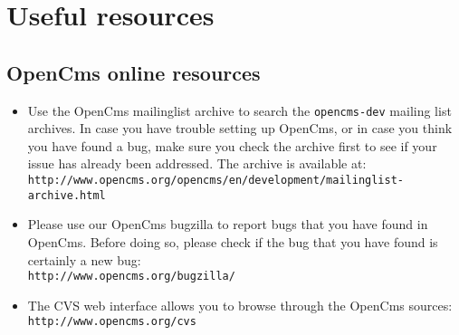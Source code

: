 \chapter{Useful resources}

\section{OpenCms online resources}

\begin{itemize}
\item Use the OpenCms mailinglist archive to search the {\tt opencms-dev} mailing list archives.
In case you have trouble setting up OpenCms, or in case you think you have found a bug,
make sure you check the archive first to see if your issue has already been addressed.
The archive is available at:\\
{\tt http://www.opencms.org/opencms/en/development/mailinglist-archive.html}
\item Please use our OpenCms bugzilla to report bugs that you have found in OpenCms. 
Before doing so, please check if the bug that you have found is certainly a new bug:\\
{\tt http://www.opencms.org/bugzilla/}
\item The CVS web interface allows you to browse through the OpenCms sources:\\
{\tt http://www.opencms.org/cvs}
\end{itemize}

